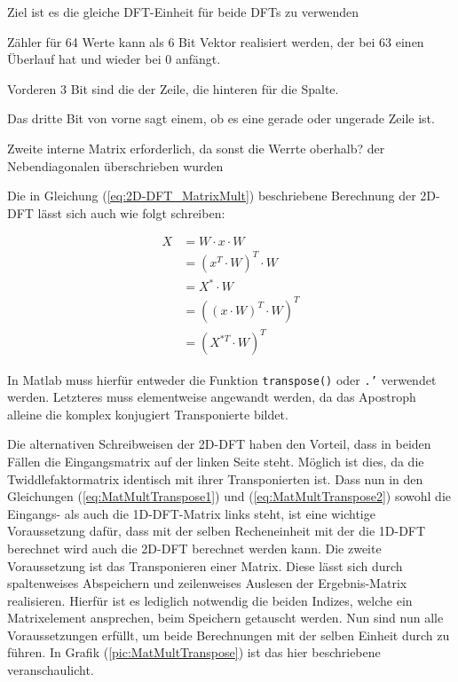 Ziel ist es die gleiche DFT-Einheit für beide DFTs zu verwenden

Zähler für 64 Werte kann als 6 Bit Vektor realisiert werden, der bei 63 einen Überlauf hat und wieder bei 0 anfängt.

Vorderen 3 Bit sind die der Zeile, die hinteren für die Spalte.

Das dritte Bit von vorne sagt einem, ob es eine gerade oder ungerade Zeile ist.

Zweite interne Matrix erforderlich, da sonst die Werrte oberhalb? der
Nebendiagonalen  überschrieben wurden
 
 
 
Die in Gleichung (\ref{eq:2D-DFT_MatrixMult}) beschriebene Berechnung der 2D-DFT lässt sich auch wie folgt schreiben:

\begin{align}
 X &= W \cdot x \cdot W \nonumber \\
   &= \left(x^T\cdot W\right)^T\cdot W \label{eq:MatMultTranspose1} \\
   &= X^* \cdot W \nonumber\\
   &= \left(\left(x\cdot W\right)^T\cdot W\right)^T \label{eq:MatMultTranspose2}\\
   &= \left(X^{*T} \cdot W\right)^T \nonumber
\end{align}

In Matlab muss hierfür entweder die Funktion \texttt{transpose()} oder \texttt{.'} verwendet werden. Letzteres muss elementweise angewandt werden, da das Apostroph
alleine die komplex konjugiert Transponierte bildet.

Die alternativen Schreibweisen der 2D-DFT haben den Vorteil, dass in beiden Fällen die Eingangsmatrix auf der linken Seite steht. Möglich ist dies, da die 
Twiddlefaktormatrix identisch mit ihrer Transponierten ist.
Dass nun in den Gleichungen (\ref{eq:MatMultTranspose1}) und (\ref{eq:MatMultTranspose2}) sowohl die Eingangs- als auch die 1D-DFT-Matrix links steht, ist eine wichtige 
Voraussetzung dafür, dass mit der selben Recheneinheit mit der die 1D-DFT berechnet wird auch die 2D-DFT berechnet werden kann.
Die zweite Voraussetzung ist das Transponieren einer Matrix. Diese lässt sich durch spaltenweises Abspeichern und zeilenweises Auslesen der Ergebnis-Matrix realisieren.
Hierfür ist es lediglich notwendig die beiden Indizes, welche ein Matrixelement ansprechen, beim Speichern getauscht werden. Nun sind nun alle Voraussetzungen erfüllt, 
um beide Berechnungen mit der selben Einheit durch zu führen. In Grafik (\ref{pic:MatMultTranspose}) ist das hier beschriebene veranschaulicht.


